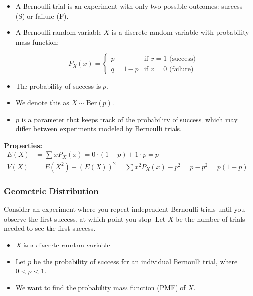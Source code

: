 \documentclass{article}
\begin{document}
    \begin{itemize}
        \item A Bernoulli trial is an experiment with only two possible outcomes: success (S) or failure (F).
        \item A Bernoulli random variable $X$ is a discrete random variable with probability mass function:
        
        \[
        P_X(x) = 
        \begin{cases} 
            p & \text{if } x = 1 \text{ (success)} \\
            q = 1 - p & \text{if } x = 0 \text{ (failure)}
        \end{cases}
        \]
        
        \item The probability of success is $p$.
        \item We denote this as $X \sim \text{Ber}(p)$.
        \item $p$ is a parameter that keeps track of the probability of success, which may differ between experiments modeled by Bernoulli trials.
    \end{itemize}

    \textbf{Properties:}
    \begin{align*}
        E(X) &= \sum xP_X(x) = 0 \cdot (1-p) + 1 \cdot p = p \\
        V(X) &= E(X^2) - (E(X))^2 = \sum x^2 P_X(x) - p^2 = p - p^2 = p(1-p)
    \end{align*}

    \subsubsection*{Geometric Distribution}

    Consider an experiment where you repeat independent Bernoulli trials until you observe the first success, at which point you stop. Let $X$ be the number of trials needed to see the first success.

    \begin{itemize}
        \item $X$ is a discrete random variable.
        \item Let $p$ be the probability of success for an individual Bernoulli trial, where $0 < p < 1$.
        \item We want to find the probability mass function (PMF) of $X$.
    \end{itemize}
\end{document}
